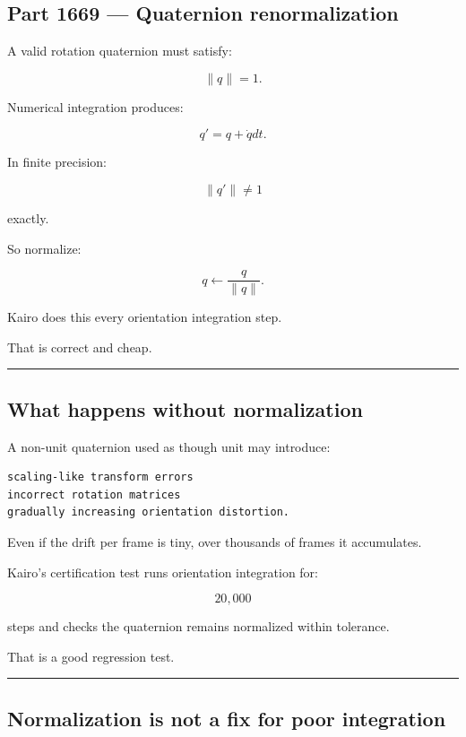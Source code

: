 \subsection{Part 1669 --- Quaternion renormalization}\label{06-engine-ii-ch037-part-1669-quaternion-renormalization}

A valid rotation quaternion must satisfy:

\[
\|q\|=1.
\]

Numerical integration produces:

\[
q'
=
q+\dot qdt.
\]

In finite precision:

\[
\|q'\|
\neq1
\]

exactly.

So normalize:

\[
\boxed{
q
\leftarrow
\frac{q}{\|q\|}.
}
\]

Kairo does this every orientation integration step.

That is correct and cheap.

\begin{center}\rule{0.5\linewidth}{0.5pt}\end{center}

\subsection{What happens without normalization}\label{06-engine-ii-ch037-what-happens-without-normalization}

A non-unit quaternion used as though unit may introduce:

\begin{verbatim}
scaling-like transform errors
incorrect rotation matrices
gradually increasing orientation distortion.
\end{verbatim}

Even if the drift per frame is tiny, over thousands of frames it accumulates.

Kairo's certification test runs orientation integration for:

\[
20,000
\]

steps and checks the quaternion remains normalized within tolerance.

That is a good regression test.

\begin{center}\rule{0.5\linewidth}{0.5pt}\end{center}

\subsection{Normalization is not a fix for poor integration}\label{06-engine-ii-ch037-normalization-is-not-a-fix-for-poor-integration}


